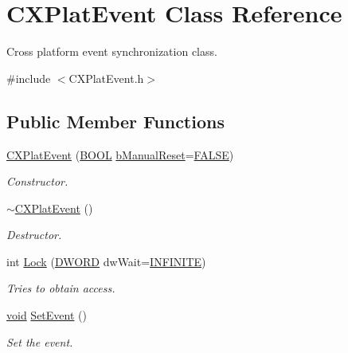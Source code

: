 \hypertarget{class_c_x_plat_event}{\section{\-C\-X\-Plat\-Event \-Class \-Reference}
\label{class_c_x_plat_event}
}


\-Cross platform event synchronization class.  




{\ttfamily \#include $<$\-C\-X\-Plat\-Event.\-h$>$}

\subsection*{\-Public \-Member \-Functions}
\begin{DoxyCompactItemize}
\item 
\hyperlink{class_c_x_plat_event_a818eb0ba93b14314d0a153bad8b9c9ec}{\-C\-X\-Plat\-Event} (\hyperlink{_cpclient_8h_a3be13892ae7076009afcf121347dd319}{\-B\-O\-O\-L} \hyperlink{class_c_x_plat_event_aa588099a688b7be58346f5b05d55eb91}{b\-Manual\-Reset}=\hyperlink{_x_plat_8h_aa93f0eb578d23995850d61f7d61c55c1}{\-F\-A\-L\-S\-E})
\begin{DoxyCompactList}\small\item\em \-Constructor. \end{DoxyCompactList}\item 
\hyperlink{class_c_x_plat_event_a448a4eee2fd5ac8e5a5e1550850bdbd9}{$\sim$\-C\-X\-Plat\-Event} ()
\begin{DoxyCompactList}\small\item\em \-Destructor. \end{DoxyCompactList}\item 
int \hyperlink{class_c_x_plat_event_ad053765292f1c8d1f91c730e805b8fa5}{\-Lock} (\hyperlink{_x_plat_8h_aa39b39d94407451a6ec0226479db68cf}{\-D\-W\-O\-R\-D} dw\-Wait=\hyperlink{_x_plat_8h_aa84a29002ab81c719c0d07bb446296e0}{\-I\-N\-F\-I\-N\-I\-T\-E})
\begin{DoxyCompactList}\small\item\em \-Tries to obtain access. \end{DoxyCompactList}\item 
\hyperlink{_cpclient_8h_a6464f7480a0fd0ee170cba12b2c0497f}{void} \hyperlink{class_c_x_plat_event_ad43844482b5cee3b03c6e38680b0a259}{\-Set\-Event} ()
\begin{DoxyCompactList}\small\item\em \-Set the event. \end{DoxyCompactList}\item 

\end{DoxyCompactItemize}
